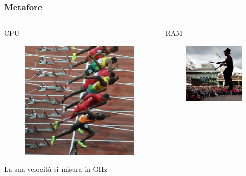 \documentclass[handout]{beamer}
\begin{document}
\begin{frame}
\frametitle{Metafore}
\begin{columns}
\begin{column}{.3\textwidth}
  \begin{center}
  CPU
  \begin{figure}
    \includegraphics[width=\columnwidth]{img/sprint.jpg}
  \end{figure}
  La sua velocità si misura in GHz
  \end{center}
\end{column}
\begin{column}{.3\textwidth}
  \begin{center}
    RAM
    \begin{figure}
      \includegraphics[width=\columnwidth]{img/giocoliere.jpg}

\end{figure}
\end{center}
\end{column}
\end{columns}
\end{frame}
\end{document}

